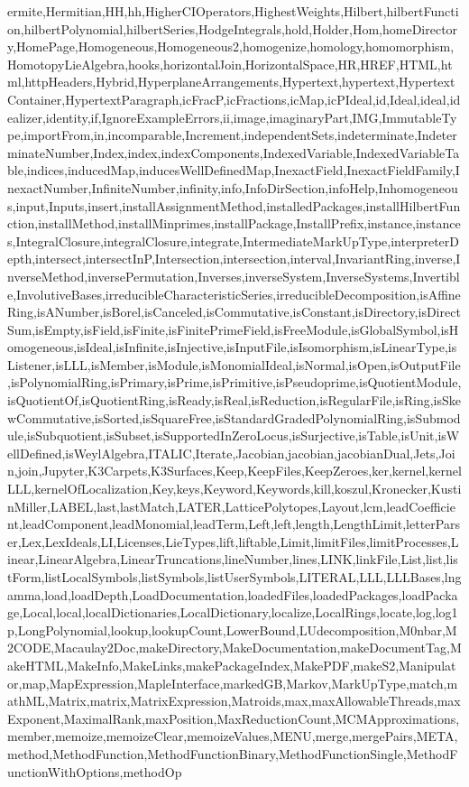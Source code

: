 {ermite,Hermitian,HH,hh,HigherCIOperators,HighestWeights,Hilbert,hilbertFunction,hilbertPolynomial,hilbertSeries,HodgeIntegrals,hold,Holder,Hom,homeDirectory,HomePage,Homogeneous,Homogeneous2,homogenize,homology,homomorphism,HomotopyLieAlgebra,hooks,horizontalJoin,HorizontalSpace,HR,HREF,HTML,html,httpHeaders,Hybrid,HyperplaneArrangements,Hypertext,hypertext,HypertextContainer,HypertextParagraph,icFracP,icFractions,icMap,icPIdeal,id,Ideal,ideal,idealizer,identity,if,IgnoreExampleErrors,ii,image,imaginaryPart,IMG,ImmutableType,importFrom,in,incomparable,Increment,independentSets,indeterminate,IndeterminateNumber,Index,index,indexComponents,IndexedVariable,IndexedVariableTable,indices,inducedMap,inducesWellDefinedMap,InexactField,InexactFieldFamily,InexactNumber,InfiniteNumber,infinity,info,InfoDirSection,infoHelp,Inhomogeneous,input,Inputs,insert,installAssignmentMethod,installedPackages,installHilbertFunction,installMethod,installMinprimes,installPackage,InstallPrefix,instance,instances,IntegralClosure,integralClosure,integrate,IntermediateMarkUpType,interpreterDepth,intersect,intersectInP,Intersection,intersection,interval,InvariantRing,inverse,InverseMethod,inversePermutation,Inverses,inverseSystem,InverseSystems,Invertible,InvolutiveBases,irreducibleCharacteristicSeries,irreducibleDecomposition,isAffineRing,isANumber,isBorel,isCanceled,isCommutative,isConstant,isDirectory,isDirectSum,isEmpty,isField,isFinite,isFinitePrimeField,isFreeModule,isGlobalSymbol,isHomogeneous,isIdeal,isInfinite,isInjective,isInputFile,isIsomorphism,isLinearType,isListener,isLLL,isMember,isModule,isMonomialIdeal,isNormal,isOpen,isOutputFile,isPolynomialRing,isPrimary,isPrime,isPrimitive,isPseudoprime,isQuotientModule,isQuotientOf,isQuotientRing,isReady,isReal,isReduction,isRegularFile,isRing,isSkewCommutative,isSorted,isSquareFree,isStandardGradedPolynomialRing,isSubmodule,isSubquotient,isSubset,isSupportedInZeroLocus,isSurjective,isTable,isUnit,isWellDefined,isWeylAlgebra,ITALIC,Iterate,Jacobian,jacobian,jacobianDual,Jets,Join,join,Jupyter,K3Carpets,K3Surfaces,Keep,KeepFiles,KeepZeroes,ker,kernel,kernelLLL,kernelOfLocalization,Key,keys,Keyword,Keywords,kill,koszul,Kronecker,KustinMiller,LABEL,last,lastMatch,LATER,LatticePolytopes,Layout,lcm,leadCoefficient,leadComponent,leadMonomial,leadTerm,Left,left,length,LengthLimit,letterParser,Lex,LexIdeals,LI,Licenses,LieTypes,lift,liftable,Limit,limitFiles,limitProcesses,Linear,LinearAlgebra,LinearTruncations,lineNumber,lines,LINK,linkFile,List,list,listForm,listLocalSymbols,listSymbols,listUserSymbols,LITERAL,LLL,LLLBases,lngamma,load,loadDepth,LoadDocumentation,loadedFiles,loadedPackages,loadPackage,Local,local,localDictionaries,LocalDictionary,localize,LocalRings,locate,log,log1p,LongPolynomial,lookup,lookupCount,LowerBound,LUdecomposition,M0nbar,M2CODE,Macaulay2Doc,makeDirectory,MakeDocumentation,makeDocumentTag,MakeHTML,MakeInfo,MakeLinks,makePackageIndex,MakePDF,makeS2,Manipulator,map,MapExpression,MapleInterface,markedGB,Markov,MarkUpType,match,mathML,Matrix,matrix,MatrixExpression,Matroids,max,maxAllowableThreads,maxExponent,MaximalRank,maxPosition,MaxReductionCount,MCMApproximations,member,memoize,memoizeClear,memoizeValues,MENU,merge,mergePairs,META,method,MethodFunction,MethodFunctionBinary,MethodFunctionSingle,MethodFunctionWithOptions,methodOp}
